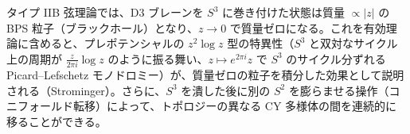 \begin{enumerate}
  タイプ IIB 弦理論では、D3 ブレーンを $S^3$ に巻き付けた状態は質量 $\propto|z|$ の BPS 粒子（ブラックホール）となり、$z\to0$ で質量ゼロになる。これを有効理論に含めると、プレポテンシャルの $z^2\log z$ 型の特異性（$S^3$ と双対なサイクル上の周期が $\frac{z}{2\pi i}\log z$ のように振る舞い、$z\mapsto e^{2\pi i}z$ で $S^3$ のサイクル分ずれる Picard--Lefschetz モノドロミー）が、質量ゼロの粒子を積分した効果として説明される（Strominger）。さらに、$S^3$ を潰した後に別の $S^2$ を膨らませる操作（コニフォールド転移）によって、トポロジーの異なる CY 多様体の間を連続的に移ることができる。
\end{enumerate}
